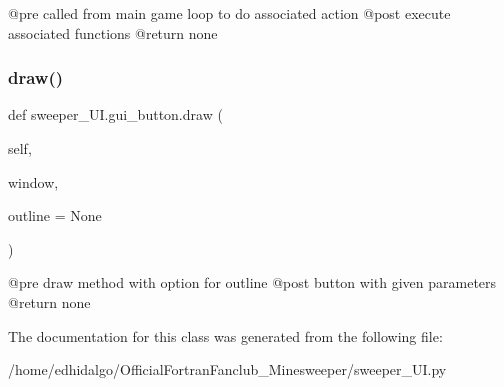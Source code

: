 \begin{DoxyVerb}@pre called from main game loop to do associated action
@post execute associated functions
@return none
\end{DoxyVerb}
 \mbox{\label{classsweeper___u_i_1_1gui__button_ae168198450518f00782017759a8879bd}} 
\subsubsection{\texorpdfstring{draw()}{draw()}}
{\footnotesize\ttfamily def sweeper\+\_\+\+U\+I.\+gui\+\_\+button.\+draw (\begin{DoxyParamCaption}\item[{}]{self,  }\item[{}]{window,  }\item[{}]{outline = {\ttfamily None} }\end{DoxyParamCaption})}

\begin{DoxyVerb}@pre draw method with option for outline
@post button with given parameters
@return none
\end{DoxyVerb}
 

The documentation for this class was generated from the following file\+:\begin{DoxyCompactItemize}
\item 
/home/edhidalgo/\+Official\+Fortran\+Fanclub\+\_\+\+Minesweeper/sweeper\+\_\+\+U\+I.\+py\end{DoxyCompactItemize}
